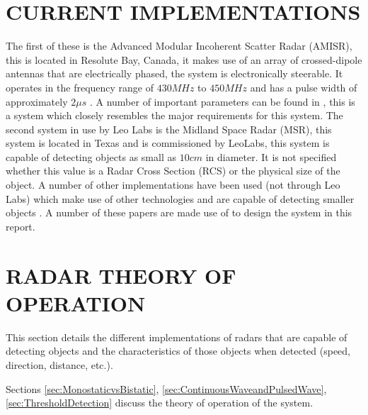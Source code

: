 \documentclass[11pt]{witseiepaper}
\begin{document}
\begin{bibunit}[witseie]

\section{CURRENT IMPLEMENTATIONS} \label{sec:CurrentImplementations}
 The first of these is the Advanced Modular Incoherent Scatter Radar (AMISR), this is located in Resolute Bay, Canada, it makes use of an array of crossed-dipole antennas that are electrically phased, the system is electronically steerable. It operates in the frequency range of $430 MHz$ to $450 MHz$ and has a pulse width of approximately $2 \mu s$ \cite{AMISR}. A number of important parameters can be found in \cite{AMISR}, this is a system which closely resembles the major requirements for this system.
The second system in use by Leo Labs is the Midland Space Radar (MSR), this system is located in Texas and is commissioned by LeoLabs, this system is capable of detecting objects as small as $10 cm$ in diameter. It is not specified whether this value is a Radar Cross Section  (RCS) or the physical size of the object.
A number of other implementations have been used (not through Leo Labs) which make use of other technologies and are capable of detecting smaller objects \cite{EISCAT, SIMO, telescope, BeamForming, OrbitDetermination, PlanarArray}. A number of these papers are made use of to design the system in this report.


\section{RADAR THEORY OF OPERATION} \label{sec:RadarTheoryOfOperation}
This section details the different implementations of radars that are capable of detecting objects and the characteristics of those objects when detected (speed, direction, distance, etc.).

Sections \ref{sec:MonostaticvsBistatic}, \ref{sec:ContinuousWaveandPulsedWave}, \ref{sec:ThresholdDetection} discuss the theory of operation of the system.


\end{bibunit}
\end{document}
